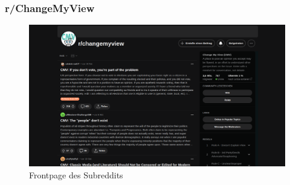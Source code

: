 \documentclass[compress,12pt]{beamer}
\begin{document}
    \begin{frame}[plain]
        \frametitle{r/ChangeMyView}
        \begin{figure}
            \centering
            \includegraphics[width=\textwidth]{../images/cmv-example-main-page}
            \caption{Frontpage des Subreddits}
            \label{fig:frontpage}
        \end{figure}
    \end{frame}
\end{document}
